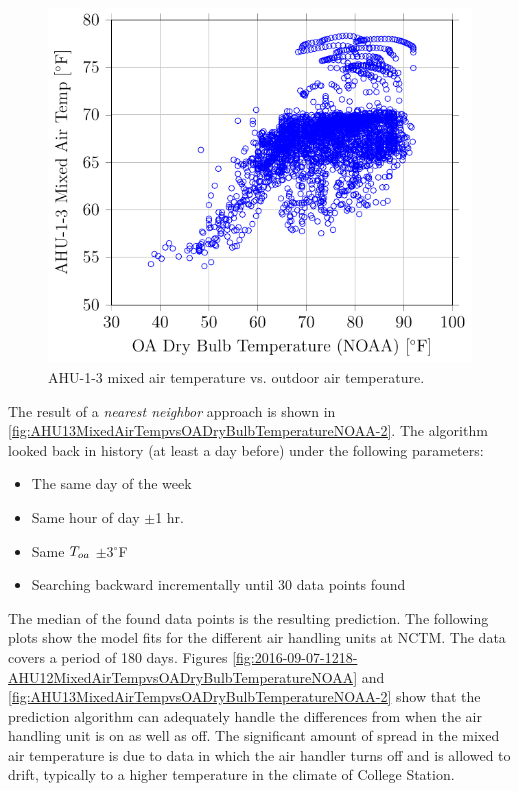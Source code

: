 \begin{figure}
\centering
\includegraphics[]{Plots/2016-06-13-1459-AHU13MixedAirTempvsOADryBulbTemperatureNOAA.pdf}
\caption{AHU-1-3 mixed air temperature vs. outdoor air temperature.}
\label{fig:AHU13MixedAirTempvsOADryBulbTemperatureNOAA}
\end{figure}


The result of a \textit{nearest neighbor} approach is shown in \figref{} \ref{fig:AHU13MixedAirTempvsOADryBulbTemperatureNOAA-2}. The algorithm looked back in history (at least a day before) under the following parameters:

\begin{itemize}
    \item The same day of the week
    \item Same hour of day \(\pm\)1 hr.
    \item Same \(T_{oa}{}\) \(\pm\)3\(^\circ\)F
    \item Searching backward incrementally until 30 data points found
\end{itemize}

The median of the found data points is the resulting prediction. The following
plots show the model fits for the different air handling units at NCTM. The
data covers a period of 180 days. Figures
\ref{fig:2016-09-07-1218-AHU12MixedAirTempvsOADryBulbTemperatureNOAA} and
\ref{fig:AHU13MixedAirTempvsOADryBulbTemperatureNOAA-2} show that the
prediction algorithm can adequately handle the differences from when the air
handling unit is on as well as off. The significant amount of spread in the
mixed air temperature is due to data in which the air handler turns off and is
allowed to drift, typically to a higher temperature in the climate of College
Station. 

